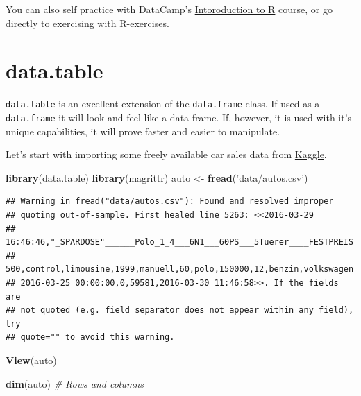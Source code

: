 \documentclass[]{book}
\newenvironment{Shaded}{\begin{snugshade}}{\end{snugshade}}
\newcommand{\KeywordTok}[1]{\textcolor[rgb]{0.13,0.29,0.53}{\textbf{#1}}}
\newcommand{\StringTok}[1]{\textcolor[rgb]{0.31,0.60,0.02}{#1}}
\newcommand{\CommentTok}[1]{\textcolor[rgb]{0.56,0.35,0.01}{\textit{#1}}}
\newcommand{\NormalTok}[1]{#1}
\theoremstyle{definition}
\theoremstyle{definition}
\theoremstyle{definition}
\theoremstyle{remark}
\begin{document}
You can also self practice with DataCamp's
\href{https://www.datacamp.com/courses/free-introduction-to-r}{Intoroduction
to R} course, or go directly to exercising with
\href{https://www.r-exercises.com/start-here-to-learn-r/}{R-exercises}.

\chapter{data.table}\label{datatable}

\texttt{data.table} is an excellent extension of the \texttt{data.frame}
class. If used as a \texttt{data.frame} it will look and feel like a
data frame. If, however, it is used with it's unique capabilities, it
will prove faster and easier to manipulate.

Let's start with importing some freely available car sales data from
\href{https://www.kaggle.com/orgesleka/used-cars-database}{Kaggle}.

\begin{Shaded}
\begin{Highlighting}[]
\KeywordTok{library}\NormalTok{(data.table)}
\KeywordTok{library}\NormalTok{(magrittr)}
\NormalTok{auto <-}\StringTok{ }\KeywordTok{fread}\NormalTok{(}\StringTok{'data/autos.csv'}\NormalTok{)}
\end{Highlighting}
\end{Shaded}

\begin{verbatim}
## Warning in fread("data/autos.csv"): Found and resolved improper
## quoting out-of-sample. First healed line 5263: <<2016-03-29
## 16:46:46,"_SPARDOSE"______Polo_1_4___6N1___60PS___5Tuerer____FESTPREIS,privat,Angebot,
## 500,control,limousine,1999,manuell,60,polo,150000,12,benzin,volkswagen,ja,
## 2016-03-25 00:00:00,0,59581,2016-03-30 11:46:58>>. If the fields are
## not quoted (e.g. field separator does not appear within any field), try
## quote="" to avoid this warning.
\end{verbatim}

\begin{Shaded}
\begin{Highlighting}[]
\KeywordTok{View}\NormalTok{(auto)}
\end{Highlighting}
\end{Shaded}

\begin{Shaded}
\begin{Highlighting}[]
\KeywordTok{dim}\NormalTok{(auto) }\CommentTok{#  Rows and columns}
\end{Highlighting}
\end{Shaded}
\end{document}
